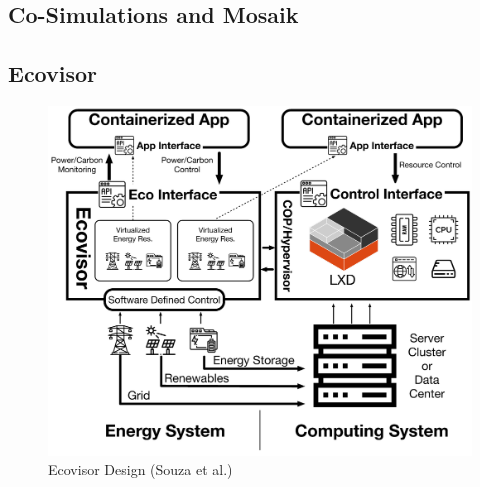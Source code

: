 \subsection{Co-Simulations and Mosaik}
\subsection{Ecovisor}

\begin{figure}
    \centering
    \includegraphics[width=\linewidth]{figures/ecovisor_design}
    \caption{Ecovisor Design (Souza et al.) \cite{souza2023}}
    \label{fig:ecovisor_design}
\end{figure}
